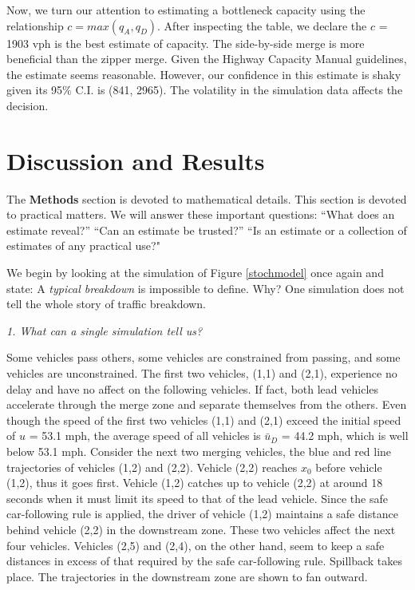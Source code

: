 \documentclass[Proceedings]{ascelike}
\begin{document}
Now, we turn our attention to estimating a bottleneck capacity using the relationship $c = max(q_A,q_D)$. After inspecting the table, we declare the $c$ = 1903 vph is the best estimate of capacity. The side-by-side merge is more beneficial than the zipper merge. Given the Highway Capacity Manual guidelines, the estimate seems reasonable. However, our confidence in this estimate is shaky given its 95$\%$ C.I. is (841, 2965). The volatility in the simulation data affects the decision.


\section{Discussion and Results}

The \textbf{Methods} section is devoted to mathematical details. This section is devoted to practical matters. We will answer these important questions: ``What does an estimate reveal?'' ``Can an estimate be trusted?'' ``Is an estimate or a collection of estimates of any practical use?" 

We begin by looking at the simulation  of Figure \ref{stochmodel} once again and state: A \emph{typical breakdown} is impossible to define.  Why? One simulation does not tell the whole story of traffic breakdown. 

\noindent \emph{1. What can a single simulation tell us? }

Some vehicles pass others, some vehicles are constrained from passing, and some vehicles are unconstrained.   The first two vehicles, (1,1) and (2,1), experience no delay and have no affect on the following vehicles. If fact, both lead vehicles accelerate through the merge zone and separate themselves from the others. Even though  the speed  of the first two vehicles (1,1) and (2,1) exceed the initial speed of  $u$ = 53.1 mph, the average speed of all vehicles is $\bar{u}_D$ = 44.2 mph, which is well below 53.1 mph.  Consider the next two merging vehicles,  the blue and red line trajectories of  vehicles (1,2) and (2,2). Vehicle (2,2) reaches $x_0$ before vehicle (1,2), thus it goes first. Vehicle (1,2) catches up to vehicle (2,2) at around 18 seconds when it must limit its speed to that of the lead vehicle.  Since the safe car-following rule is applied, the driver of vehicle (1,2)  maintains a safe distance behind vehicle (2,2) in the downstream zone. These two vehicles affect the next four vehicles. Vehicles (2,5) and (2,4), on the other hand, seem to keep a safe distances in excess of that required by the safe car-following rule. Spillback takes place. The trajectories in the downstream zone are shown to fan outward.  
\end{document}
